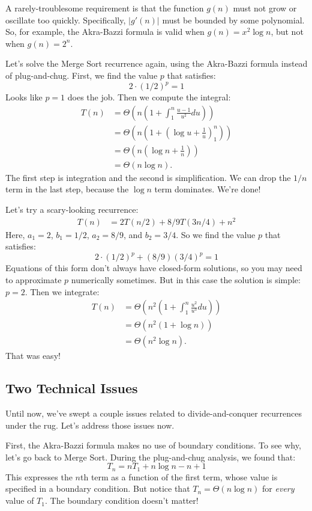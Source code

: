 A rarely-troublesome requirement is that the function $g(n)$ must not
grow or oscillate too quickly.  Specifically, $|g'(n)|$ must be
bounded by some polynomial.  So, for example, the Akra-Bazzi formula
is valid when $g(n) = x^2 \log n$, but not when $g(n) = 2^n$.

Let's solve the Merge Sort recurrence again, using the Akra-Bazzi
formula instead of plug-and-chug.  First, we find the value $p$
that satisfies:
\[
2 \cdot (1/2)^p = 1
\]
Looks like $p = 1$ does the job.  Then we compute the integral:
\begin{align*}
T(n) & = \Theta\left(
n \left(1 + \int_1^n \frac{u - 1}{u^2} du\right)
\right) \\
  & = \Theta\left(
n \left(1 + \left(\log u + \frac{1}{u}\right)_1^n\right)
\right) \\
  & = \Theta\left(
n \left(\log n + \frac{1}{n}\right)
\right) \\
  & = \Theta\left(n \log n\right).
\end{align*}
The first step is integration and the second is simplification.  We
can drop the $1/n$ term in the last step, because the $\log n$ term
dominates.  We're done!

Let's try a scary-looking recurrence:
\begin{align*}
T(n) & = 2T(n/2) + 8/9T(3n/4) + n^2
\end{align*}
Here, $a_1 = 2$, $b_1 = 1/2$, $a_2 = 8/9$, and $b_2 = 3/4$.  So we
find the value $p$ that satisfies:
\[
2 \cdot (1/2)^p + (8/9) (3/4)^p = 1
\]
Equations of this form don't always have closed-form solutions, so you
may need to approximate $p$ numerically sometimes.  But in this case
the solution is simple: $p = 2$.  Then we integrate:
\begin{align*}
T(n) & = \Theta\left(
n^2 \left(1 + \int_1^n \frac{u^2}{u^3} du \right) \right) \\
  & = \Theta\left(
n^2 (1 + \log n) \right) \\
  & = \Theta\left(n^2 \log n\right).
\end{align*}
That was easy!

\subsection{Two Technical Issues}

Until now, we've swept a couple issues related to divide-and-conquer
recurrences under the rug.  Let's address those issues now.

First, the Akra-Bazzi formula makes no use of boundary conditions.  To
see why, let's go back to Merge Sort.  During the plug-and-chug
analysis, we found that:
\begin{equation*}
T_n = n T_1 + n \log n - n + 1
\end{equation*}
This expresses the $n$th term as a function of the first term, whose
value is specified in a boundary condition.  But notice that $T_n =
\Theta(n \log n)$ for \emph{every} value of $T_1$.  The boundary
condition doesn't matter!

